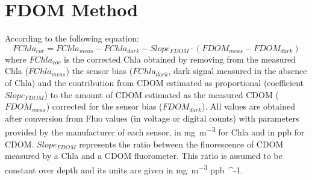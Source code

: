 \documentclass[journal abbreviation, manuscript]{copernicus}
\begin{document}







\appendix
\section{FDOM Method}    %
\label{sec:xing}
According to the following equation:
\begin{equation}\label{eq:Xing2017}
    FChla_{cor} = FChla_{meas} - FChla_{dark} - Slope_{FDOM} \cdot (FDOM_{meas} - FDOM_{dark}) 
\end{equation}
where $FChla_{cor}$ is the corrected Chla obtained by removing from the measured Chla ($FChla_{meas}$) the sensor bias ($FChla_{dark}$, dark signal measured in the absence of Chla) and the contribution from CDOM estimated as proportional (coefficient $Slope_{FDOM}$) to the amount of CDOM estimated as the measured CDOM ($FDOM_{meas}$) corrected for the sensor bias ($FDOM_{dark}$). All values are obtained after conversion from Fluo values (in voltage or digital counts) with parameters provided by the manufacturer of each sensor, in \unit{mg~m^{-3}} for Chla and in \unit{ppb} for CDOM. $Slope_{FDOM}$ represents the ratio between the fluorescence of CDOM measured by a Chla and a CDOM fluorometer. This ratio is assumed to be constant over depth and its units are given in \unit{mg~m^{-3}} \unit{ppb~^{-1}}.
\end{document}
